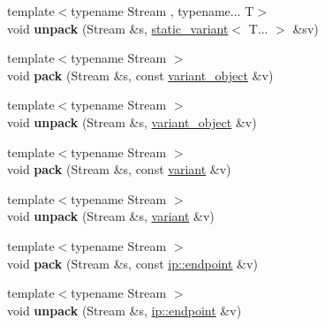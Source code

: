 \begin{DoxyCompactItemize}
\item 
\mbox{\label{namespacefc_1_1raw_a68a9a7af5dd4d4641ab6a431a22807f8}} 
{\footnotesize template$<$typename Stream , typename... T$>$ }\\void {\bfseries unpack} (Stream \&s, \mbox{\hyperlink{classfc_1_1static__variant}{static\+\_\+variant}}$<$ T... $>$ \&sv)
\item 
\mbox{\label{namespacefc_1_1raw_a9330005e0cc3bd154e24eee8e48e5948}} 
{\footnotesize template$<$typename Stream $>$ }\\void {\bfseries pack} (Stream \&s, const \mbox{\hyperlink{classfc_1_1variant__object}{variant\+\_\+object}} \&v)
\item 
\mbox{\label{namespacefc_1_1raw_ae273ecf236c8d8d212c9d5dc128347f3}} 
{\footnotesize template$<$typename Stream $>$ }\\void {\bfseries unpack} (Stream \&s, \mbox{\hyperlink{classfc_1_1variant__object}{variant\+\_\+object}} \&v)
\item 
\mbox{\label{namespacefc_1_1raw_a68cd27ab73d4d1b601b4b504e3a924bb}} 
{\footnotesize template$<$typename Stream $>$ }\\void {\bfseries pack} (Stream \&s, const \mbox{\hyperlink{classfc_1_1variant}{variant}} \&v)
\item 
\mbox{\label{namespacefc_1_1raw_ad898ed0ffe169c5ea5244a1ce4558eda}} 
{\footnotesize template$<$typename Stream $>$ }\\void {\bfseries unpack} (Stream \&s, \mbox{\hyperlink{classfc_1_1variant}{variant}} \&v)
\item 
\mbox{\label{namespacefc_1_1raw_a0fdb9c6ae378596a96db14f8c4408dee}} 
{\footnotesize template$<$typename Stream $>$ }\\void {\bfseries pack} (Stream \&s, const \mbox{\hyperlink{classfc_1_1ip_1_1endpoint}{ip\+::endpoint}} \&v)
\item 
\mbox{\label{namespacefc_1_1raw_a463c3e6576b91e9bb634d9fac69b72ef}} 
{\footnotesize template$<$typename Stream $>$ }\\void {\bfseries unpack} (Stream \&s, \mbox{\hyperlink{classfc_1_1ip_1_1endpoint}{ip\+::endpoint}} \&v)

\end{DoxyCompactItemize}
